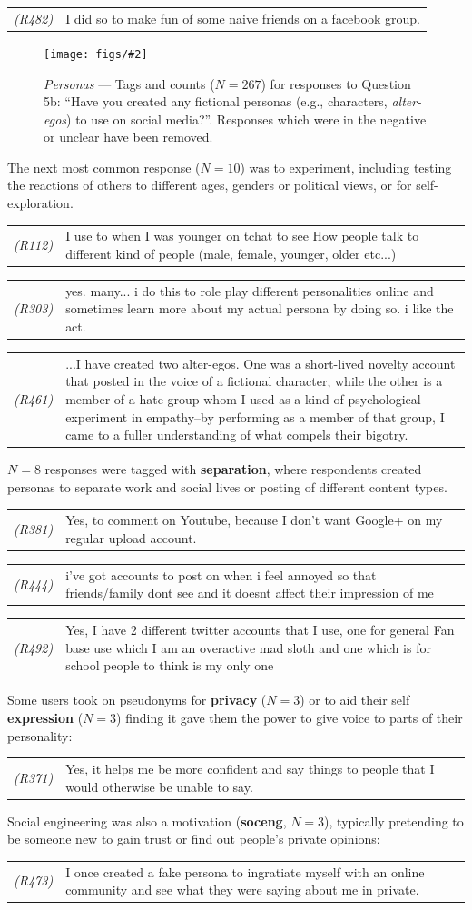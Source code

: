 \documentclass{sig-alternate}
\newcommand{\fig}[3][1.0]{
\begin{figure}[tbp]
\begin{center}
\texttt{[image: figs/\#2]}
\protect\caption{#3}
\label{fig:#2}
\end{center}
\end{figure}
}
\newcommand{\stag}[1]{\textbf{#1}}
\newcommand{\example}[2]{%

\vspace{0.10cm}

\hspace{-3.9ex} \begin{tabular}{ p{0.6cm} p{7.15cm} }
    {\it \small (R#1)} & #2 \\
\end{tabular}%
\vspace{0.10cm}

}
\begin{document}
\example{482}{I did so to make fun of some naive friends on a facebook group.}


\fig{q5bfrequency}{\emph{Personas} --- Tags and counts ($N=267$) for responses to Question 5b: ``Have you created any fictional personas (e.g., characters, \emph{alter-egos}) to use on social media?''. Responses which were in the negative or unclear have been removed.}


The next most common response ($N=10$) was to experiment, including testing the reactions of others to different ages, genders or political views, or for self-exploration.

\example{112}{I use to when I was younger on tchat to see How people talk to different kind of people (male, female, younger, older etc...)}

\example{303}{yes. many... i do this to role play different personalities online and sometimes learn more about my actual persona by doing so. i like the act.}

\example{461}{...I have created two alter-egos. One was a short-lived novelty account that posted in the voice of a fictional character, while the other is a member of a hate group whom I used as a kind of psychological experiment in empathy--by performing as a member of that group, I came to a fuller understanding of what compels their bigotry.}

$N=8$ responses were tagged with \stag{separation}, where respondents created personas to separate work and social lives or posting of different content types.

\example{381}{Yes, to comment on Youtube, because I don't want Google+ on my regular upload account.}

\example{444}{i've got accounts to post on when i feel annoyed so that friends/family dont see and it doesnt affect their impression of me}

\example{492}{Yes, I have 2 different twitter accounts that I use, one for general Fan base use which I am an overactive mad sloth and one which is for school people to think is my only one}

Some users took on pseudonyms for \stag{privacy} ($N=3$) or to aid their self \stag{expression} ($N=3$) finding it gave them the power to give voice to parts of their personality:
\example{371}{Yes, it helps me be more confident and say things to people that I would otherwise be unable to say.}

Social engineering was also a motivation (\stag{soceng}, $N=3$), typically pretending to be someone new to gain trust or find out people's private opinions:
\example{473}{I once created a fake persona to ingratiate myself with an online community and see what they were saying about me in private.}
\end{document}
